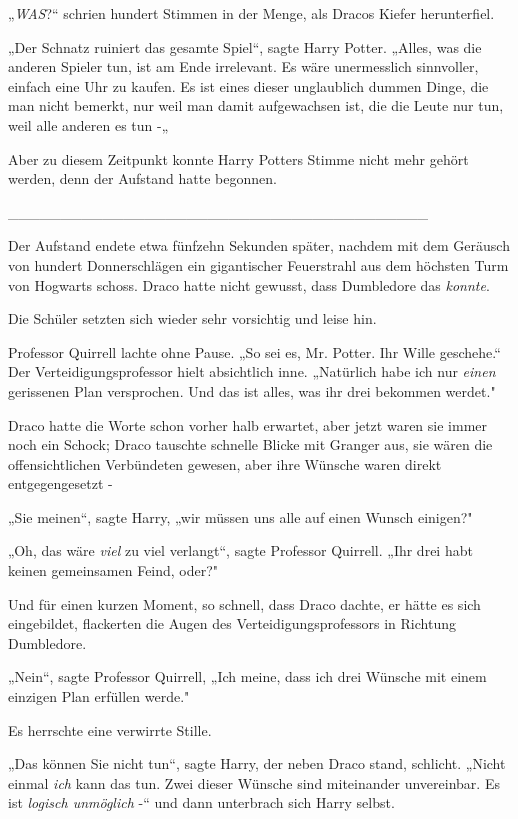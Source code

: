 {„\emph{WAS}?“ schrien hundert Stimmen in der Menge, als Dracos Kiefer herunterfiel.

„Der Schnatz ruiniert das gesamte Spiel“, sagte Harry Potter. „Alles, was die anderen Spieler tun, ist am Ende irrelevant. Es wäre unermesslich sinnvoller, einfach eine Uhr zu kaufen. Es ist eines dieser unglaublich dummen Dinge, die man nicht bemerkt, nur weil man damit aufgewachsen ist, die die Leute nur tun, weil alle anderen es tun -„

Aber zu diesem Zeitpunkt konnte Harry Potters Stimme nicht mehr gehört werden, denn der Aufstand hatte begonnen.

\_\_\_\_\_\_\_\_\_\_\_\_\_\_\_\_\_\_\_\_\_\_\_\_\_\_\_\_\_\_\_\_\_\_\_\_\_\_\_\_

Der Aufstand endete etwa fünfzehn Sekunden später, nachdem mit dem Geräusch von hundert Donnerschlägen ein gigantischer Feuerstrahl aus dem höchsten Turm von Hogwarts schoss. Draco hatte nicht gewusst, dass Dumbledore das \emph{konnte}.

Die Schüler setzten sich wieder sehr vorsichtig und leise hin.

Professor Quirrell lachte ohne Pause. „So sei es, Mr. Potter. Ihr Wille geschehe.“ Der Verteidigungsprofessor hielt absichtlich inne. „Natürlich habe ich nur \emph{einen} gerissenen Plan versprochen. Und das ist alles, was ihr drei bekommen werdet."

Draco hatte die Worte schon vorher halb erwartet, aber jetzt waren sie immer noch ein Schock; Draco tauschte schnelle Blicke mit Granger aus, sie wären die offensichtlichen Verbündeten gewesen, aber ihre Wünsche waren direkt entgegengesetzt -

„Sie meinen“, sagte Harry, „wir müssen uns alle auf einen Wunsch einigen?"

„Oh, das wäre \emph{viel} zu viel verlangt“, sagte Professor Quirrell. „Ihr drei habt keinen gemeinsamen Feind, oder?"

Und für einen kurzen Moment, so schnell, dass Draco dachte, er hätte es sich eingebildet, flackerten die Augen des Verteidigungsprofessors in Richtung Dumbledore.

„Nein“, sagte Professor Quirrell, „Ich meine, dass ich drei Wünsche mit einem einzigen Plan erfüllen werde."

Es herrschte eine verwirrte Stille.

„Das können Sie nicht tun“, sagte Harry, der neben Draco stand, schlicht. „Nicht einmal \emph{ich} kann das tun. Zwei dieser Wünsche sind miteinander unvereinbar. Es ist \emph{logisch unmöglich} -“ und dann unterbrach sich Harry selbst.

}
